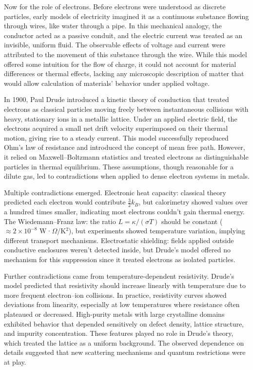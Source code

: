 Now for the role of electrons. Before electrons were understood as discrete particles, early models of electricity imagined it as a continuous substance flowing through wires, like water through a pipe. In this mechanical analogy, the conductor acted as a passive conduit, and the electric current was treated as an invisible, uniform fluid. The observable effects of voltage and current were attributed to the movement of this substance through the wire. While this model offered some intuition for the flow of charge, it could not account for material differences or thermal effects, lacking any microscopic description of matter that would allow calculation of materials' behavior under applied voltage.

In 1900, Paul Drude introduced a kinetic theory of conduction that treated electrons as classical particles moving freely between instantaneous collisions with heavy, stationary ions in a metallic lattice. Under an applied electric field, the electrons acquired a small net drift velocity superimposed on their thermal motion, giving rise to a steady current. This model successfully reproduced Ohm's law of resistance and introduced the concept of mean free path. However, it relied on Maxwell–Boltzmann statistics and treated electrons as distinguishable particles in thermal equilibrium. These assumptions, though reasonable for a dilute gas, led to contradictions when applied to dense electron systems in metals.

Multiple contradictions emerged. Electronic heat capacity: classical theory predicted each electron would contribute $\tfrac{3}{2}k_B$, but calorimetry showed values over a hundred times smaller, indicating most electrons couldn't gain thermal energy. The Wiedemann–Franz law: the ratio $L = \kappa / (\sigma T)$ should be constant ($\approx 2 \times 10^{-8}$ W·$\Omega$/K$^2$), but experiments showed temperature variation, implying different transport mechanisms. Electrostatic shielding: fields applied outside conductive enclosures weren't detected inside, but Drude's model offered no mechanism for this suppression since it treated electrons as isolated particles.

Further contradictions came from temperature-dependent resistivity. Drude's model predicted that resistivity should increase linearly with temperature due to more frequent electron–ion collisions. In practice, resistivity curves showed deviations from linearity, especially at low temperatures where resistance often plateaued or decreased. High-purity metals with large crystalline domains exhibited behavior that depended sensitively on defect density, lattice structure, and impurity concentration. These features played no role in Drude's theory, which treated the lattice as a uniform background. The observed dependence on details suggested that new scattering mechanisms and quantum restrictions were at play.

